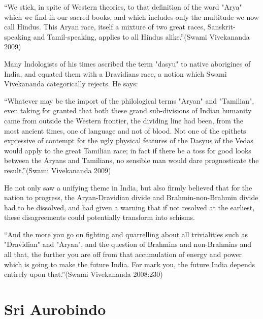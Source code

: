 \begin{myquote}
“We stick, in spite of Western theories, to that definition of the word "Arya" which we find in our sacred books, and which includes only the multitude we now call Hindus. This Aryan race, itself a mixture of two great races, Sanskrit-speaking and Tamil-speaking, applies to all Hindus alike.”(Swami Vivekananda 2009)
\end{myquote}

Many Indologists of his times ascribed the term "dasyu" to native aborigines of India, and equated them with a Dravidians race, a notion which Swami Vivekananda categorically rejects. He says:

\begin{myquote}
“Whatever may be the import of the philological terms "Aryan" and "Tamilian", even taking for granted that both these grand sub-divisions of Indian humanity came from outside the Western frontier, the dividing line had been, from the most ancient times, one of language and not of blood. Not one of the epithets expressive of contempt for the ugly physical features of the Dasyus of the Vedas would apply to the great Tamilian race; in fact if there be a toss for good looks between the Aryans and Tamilians, no sensible man would dare prognosticate the result.”(Swami Vivekananda 2009)
\end{myquote}

He not only saw a unifying theme in India, but also firmly believed that for the nation to progress, the Aryan-Dravidian divide and Brahmin-non-Brahmin divide had to be dissolved, and had given a warning that if not resolved at the earliest, these disagreements could potentially transform into schisms.

\begin{myquote}
“And the more you go on fighting and quarrelling about all trivialities such as "Dravidian" and "Aryan", and the question of Brahmins and non-Brahmins and all that, the further you are off from that accumulation of energy and power which is going to make the future India. For mark you, the future India depends entirely upon that.”(Swami Vivekananda 2008:230)
\end{myquote}


\section*{Sri Aurobindo}

